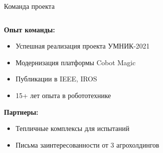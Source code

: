 \begin{frame}[t]{Команда проекта}
\begin{columns}[T]
\begin{column}{0.48\textwidth}
            \vspace{0.5cm}
            \textbf{\textcolor{aiblue}{Опыт команды:}}
            \begin{itemize}
                \item Успешная реализация проекта УМНИК-2021
                \item Модернизация платформы Cobot Magic
                \item Публикации в IEEE, IROS
                \item 15+ лет опыта в робототехнике
            \end{itemize}
            
            \vspace{0.3cm}
            \textbf{\textcolor{aiorange}{Партнеры:}}
            \begin{itemize}
                \item Тепличные комплексы для испытаний
                \item Письма заинтересованности от 3 агрохолдингов
            \end{itemize}
        \end{column}
    \end{columns}
    \end{frame}